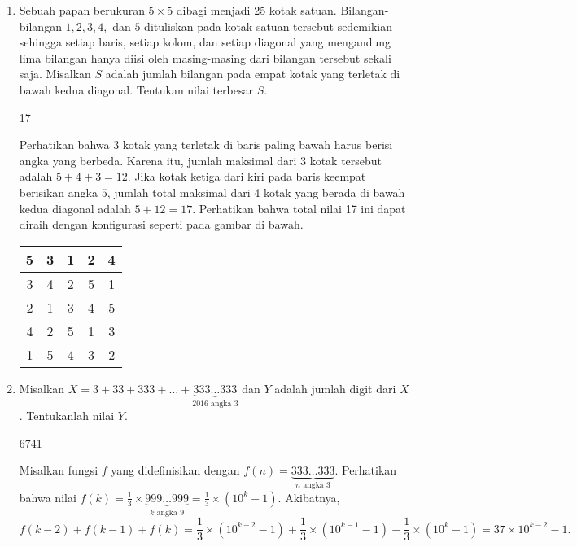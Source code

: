\documentclass[11pt]{scrartcl}
\begin{document}
\begin{enumerate}[resume]
    \item Sebuah papan berukuran $5 \times 5$ dibagi menjadi 25 kotak satuan. Bilangan-bilangan $1,2,3,4,$ dan $5$ dituliskan pada kotak satuan tersebut sedemikian sehingga setiap baris, setiap kolom, dan setiap diagonal yang mengandung lima bilangan hanya diisi oleh masing-masing dari bilangan tersebut sekali saja. Misalkan $S$ adalah jumlah bilangan pada empat kotak yang terletak di bawah kedua diagonal. Tentukan nilai terbesar $S$.
    \begin{jawaban}
	17
    \end{jawaban}
    \begin{solusi}
	Perhatikan bahwa 3 kotak yang terletak di baris paling bawah harus berisi angka yang berbeda. Karena itu, jumlah maksimal dari 3 kotak tersebut adalah $5+4+3=12$. Jika kotak ketiga dari kiri pada baris keempat berisikan angka $5$, jumlah total maksimal dari 4 kotak yang berada di bawah kedua diagonal adalah $5+12=17$. Perhatikan bahwa total nilai 17 ini dapat diraih dengan konfigurasi seperti pada gambar di bawah.
    \begin{center} 
    \begin{tabular}{ |c|c|c|c|c| }
        \hline
        5 & 3 & 1 & 2 & 4 \\
        \hline
        3 & 4 & 2 & 5 & 1 \\
        \hline
        2 & 1 & 3 & 4 & 5 \\
        \hline
        4 & 2 & \cellcolor{green!30}5 & 1 & 3 \\
        \hline
        1 &\cellcolor{green!30}5 &\cellcolor{green!30}4 &\cellcolor{green!30}3 & 2 \\
        \hline
    \end{tabular}
    \end{center}
    \end{solusi}
	
    \item Misalkan $X = 3 + 33 + 333 + \dots + \underbrace{333 \dots 333}_{2016 \text{ angka } 3}$ dan $Y$ adalah jumlah digit dari $X$. Tentukanlah nilai $Y$.
    \begin{jawaban}
        6741
    \end{jawaban}
    \begin{solusi}
        Misalkan fungsi $f$ yang didefinisikan dengan $f(n)=\underbrace{333\dots 333}_{n \text{ angka } 3}$. Perhatikan bahwa nilai $f(k)=\frac{1}{3}\times \underbrace{999 \dots 999}_{k \text{ angka } 9} = \frac{1}{3}\times (10^k-1)$. Akibatnya, $$f(k-2)+f(k-1)+f(k)=\frac{1}{3}\times (10^{k-2}-1)+\frac{1}{3}\times (10^{k-1}-1)+\frac{1}{3}\times (10^k-1)=37\times 10^{k-2}-1.$$
        

\end{solusi}
\end{enumerate}
\end{document}
